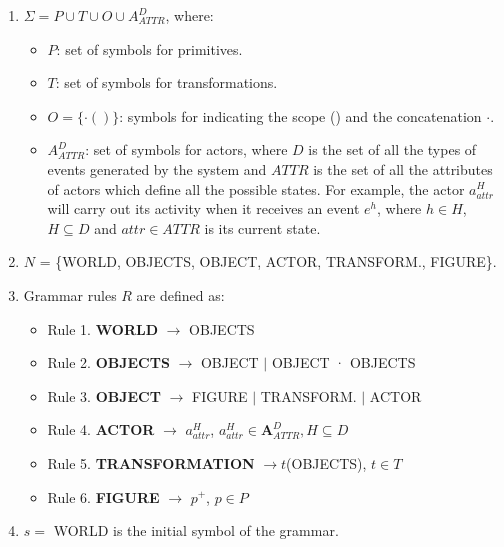 \documentclass{svmult}
\begin{document}
\begin{enumerate}
    \item $\Sigma = P \cup T \cup O \cup A_{ATTR}^D$, where:

    \begin{itemize}
        \item $P$: set of symbols for primitives.

        \item $T$: set of symbols for transformations.

        \item $O = \{ \cdotp ( ) \}$: symbols for indicating the scope () and the concatenation $\cdotp$.

        \item $A_{ATTR}^D$: set of symbols for actors, where $D$ is the set of all the types of
        events generated by the system and $ATTR$ is the set of all the attributes of actors which define
        all the possible states. For example, the actor $a_{attr}^H$ will carry out its activity when it receives an
        event $e^h$, where $h \in H$, $H \subseteq D$ and $attr \in ATTR$ is its current state.
    \end{itemize}

    \item $N$ = \{WORLD, OBJECTS, OBJECT, ACTOR, TRANSFORM., FIGURE\}.

    \item Grammar rules $R$ are defined as:

		\begin{itemize}
			\item Rule 1. \textbf{WORLD} $\rightarrow$ OBJECTS
			\item Rule 2. \textbf{OBJECTS} $\rightarrow$ OBJECT $|$ OBJECT · OBJECTS
    		\item Rule 3. \textbf{OBJECT} $\rightarrow$ FIGURE $|$ TRANSFORM. $|$ ACTOR
			\item Rule 4. \textbf{ACTOR} $\rightarrow$ $a_{attr}^H$, $a_{attr}^H \in \textbf{A}_{ATTR}^D, H \subseteq D$
			\item Rule 5. \textbf{TRANSFORMATION} $\rightarrow t$(OBJECTS), $t \in T$
			\item Rule 6. \textbf{FIGURE} $\rightarrow$ $p^+$, $p \in P$ 
	    \end{itemize}

    \item $s =$ WORLD is the initial symbol of the grammar.

\end{enumerate}
\end{document}
